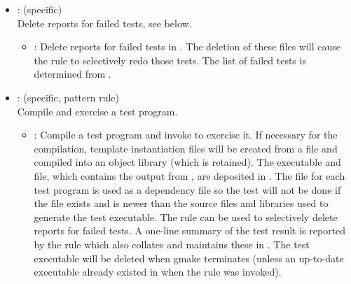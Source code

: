 \begin{itemize}
\item
    : (specific)
   \\ Delete reports for failed tests, see  below.
   \begin{itemize}
   \item
      : Delete reports for failed tests in .  The
      deletion of these files will cause the  rule to
      selectively redo those tests.  The list of failed tests is determined
      from .
   \end{itemize}

\item
    : (specific, pattern rule)
   \\ Compile and exercise a test program.
   \begin{itemize}
   \item
      : Compile a test program and invoke  to exercise
      it.  If necessary for the compilation, template instantiation files will
      be created from a  file and compiled into an object
      library (which is retained).  The executable and  file,
      which contains the output from , are deposited in
      .  The  file for each test program is
      used as a dependency file so the test will not be done if the
       file exists and is newer than the source files and
      libraries used to generate the test executable.  The 
      rule can be used to selectively delete reports for failed tests.  A
      one-line summary of the test result is reported by the rule which also
      collates and maintains these in .
      The test executable will be deleted when gmake terminates (unless an
      up-to-date executable already existed in  when the
      rule was invoked).
   \end{itemize}


\end{itemize}
